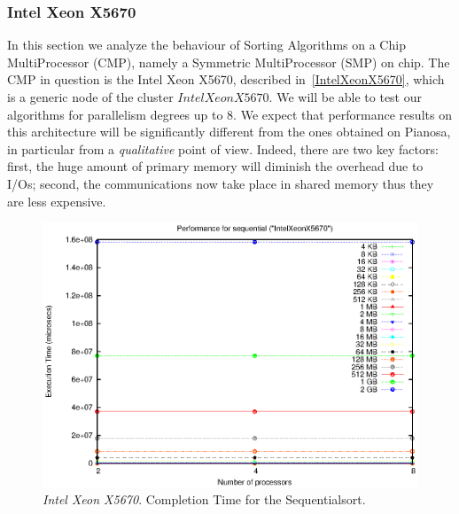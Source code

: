 \subsubsection{Intel Xeon X5670}
In this section we analyze the behaviour of Sorting Algorithms on a Chip MultiProcessor (CMP), namely a Symmetric MultiProcessor (SMP) on chip. The CMP in question is the Intel Xeon X5670, described in~\ref{IntelXeonX5670}, which is a generic node of the cluster $IntelXeonX5670$. We will be able to test our algorithms for parallelism degrees up to 8. We expect that performance results on this architecture will be significantly different from the ones obtained on Pianosa, in particular from a \textit{qualitative} point of view. Indeed, there are two key factors: first, the huge amount of primary memory will diminish the overhead due to I/Os; second, the communications now take place in shared memory thus they are less expensive.

\begin{figure}[t]
	\begin{center}
		\includegraphics[scale=0.6]{plots/test_01_IntelXeonX5670/NxTxM/sequential_IntelXeonX5670_NxTxM}
	\end{center}
  	\caption{\textit{Intel Xeon X5670}. Completion Time for the Sequentialsort.}
  	\label{sequential-IntelXeonX5670}
\end{figure}

